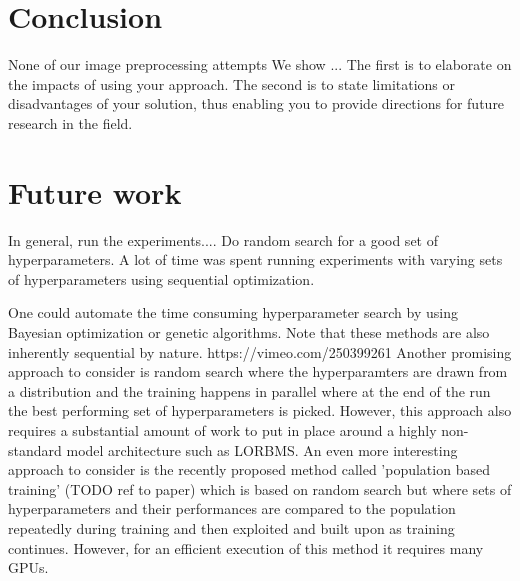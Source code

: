 \documentclass[11pt,a4paper]{article}
\begin{document}
\section{Conclusion}
None of our image preprocessing attempts
We show ...
The first is
to elaborate on the impacts of using your approach. The
second is to state limitations or disadvantages of your solution,
thus enabling you to provide directions for future
research in the field.

\section{Future work}
In general, run the experiments.... Do random search for a good set of hyperparameters. A lot of time was spent running experiments with varying sets of hyperparameters using sequential optimization.

\par One could automate the time consuming hyperparameter search by using Bayesian optimization or genetic algorithms. Note that these methods are also inherently sequential by nature. https://vimeo.com/250399261
Another promising approach to consider is random search where the hyperparamters are drawn from a distribution and the training happens in parallel where at the end of the run the best performing set of hyperparameters is picked. However, this approach also requires a substantial amount of work to put in place around a highly non-standard model architecture such as LORBMS. An even more interesting approach to consider is the recently proposed method called 'population based training' (TODO ref to paper) which is based on random search but where sets of hyperparameters and their performances are compared to the population repeatedly during training and then exploited and built upon as training continues. However, for an efficient execution of this method it requires many GPUs. 

\printbibliography
\end{document}
